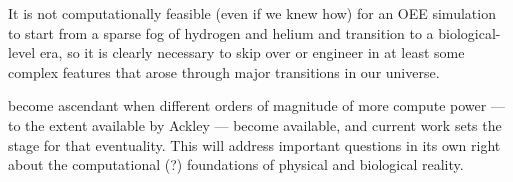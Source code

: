 \begin{displayquote}
It is not computationally feasible (even if we knew how) for an OEE simulation to start from a sparse fog of hydrogen and helium and transition to a biological-level era, so it is clearly necessary to skip over or engineer in at least some complex features that arose through major transitions in our universe. \citep{channon2019maximum}
\end{displayquote}

become ascendant when different orders of magnitude of more compute power --- to the extent available by Ackley --- become available, and current work sets the stage for that eventuality. \citep{ackley2018alife}
This will address important questions in its own right about the computational (?) foundations of physical and biological reality.
